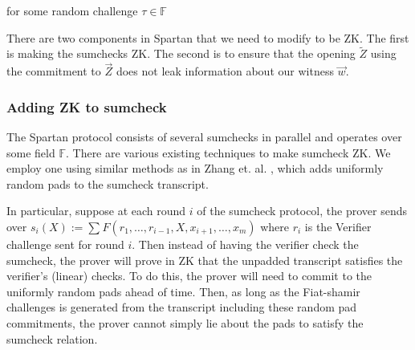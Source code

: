 for some random challenge $\tau \in \mathbb{F}$

There are two components in Spartan that we need to modify to be ZK. 
The first is making the sumchecks ZK. 
The second is to ensure that the opening $\widetilde{Z}$ using the commitment to $\vec{Z}$ does not leak information about our witness $\vec{w}$.

\subsubsection{Adding ZK to sumcheck}

The Spartan protocol consists of several sumchecks in parallel and operates over some field $\mathbb{F}$. There are various existing techniques to make sumcheck ZK. 
We employ one using similar methods as in Zhang et. al. \cite{cryptoeprint:2019/1482}, which adds uniformly random pads to the sumcheck transcript.

In particular, suppose at each round $i$ of the sumcheck protocol, the prover sends over $s_i(X) := \sum_{} F(r_1, \dots, r_{i-1}, X, x_{i+1}, \dots, x_m)$ 
where $r_i$ is the Verifier challenge sent for round $i$. Then instead of having the verifier check the sumcheck, the prover will prove in ZK that the unpadded transcript satisfies the verifier's (linear) checks.
To do this, the prover will need to commit to the uniformly random pads ahead of time. 
Then, as long as the Fiat-shamir challenges is generated from the transcript including these random pad commitments, the prover cannot simply lie about the pads to satisfy the sumcheck relation.

